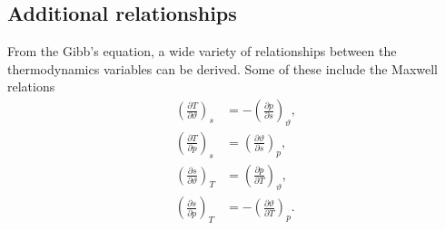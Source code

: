 \documentclass[oneside,a4paper,11pt]{report}
\begin{document}
\subsection{Additional relationships}
From the Gibb's equation, a wide variety of relationships between the thermodynamics variables can be derived. Some of these include the Maxwell relations
\begin{align}
    \label{eq:maxwell_1}
    \left( \frac{\partial T}{\partial \vartheta} \right)_s &= - \left( \frac{\partial p}{\partial s} \right)_\vartheta, \\
    \label{eq:maxwell_2}
    \left( \frac{\partial T}{\partial p} \right)_s &= \left( \frac{\partial \vartheta}{\partial s} \right)_p, \\
    \label{eq:maxwell_3}
    \left( \frac{\partial s}{\partial \vartheta} \right)_T &= \left( \frac{\partial p}{\partial T} \right)_\vartheta, \\
    \label{eq:maxwell_4}
    \left( \frac{\partial s}{\partial p} \right)_T &= - \left( \frac{\partial \vartheta}{\partial T} \right)_p.
\end{align}
\end{document}
